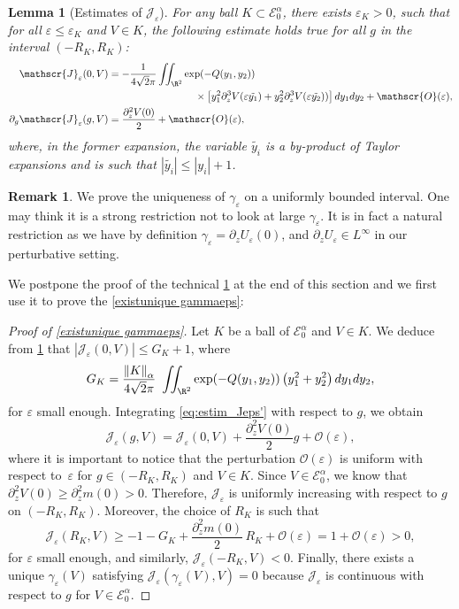\documentclass[10pt]{amsart}
\let\mathcal\mathscr
\newcommand{\cO}{\mathcal{O}}
\theoremstyle{plain}
\newtheorem{lem}[thm]{Lemma}
\theoremstyle{definition}
\newtheorem{remark}[thm]{Remark}
\newcommand{\Je}{\mathcal{J}_\eps}
\let\eps\varepsilon
\newcommand{\abs}[1]{\left\lvert#1\right\rvert}
\newcommand{\nalph}[1]{\left\lVert#1\right\rVert_\alpha}
\newcommand{\Eaz}{\mathcal{E}^\alpha_0}
\newcommand{\RK}{R_K}
\newcommand{\GK}{G_K}
\begin{document}
\begin{lem}[Estimates of $\Je$]\label{estimate Jeps}
For any ball $K \subset \Eaz$, there exists $\eps_K>0$, such that for all $\eps \leq \eps_K$ and $V \in K$, the following estimate holds true for all $g$ in the interval $(-\RK, \RK)$:
\begin{align}
\label{eq:estim_Jeps}
\Je(0,V) & = - \dfrac{1}{4 \sqrt{2}\pi} \iint _{\R^2} \exp(-Q (y_1,y_2))\\
&\hspace*{3cm}\times \left[ y_1^2 \partial_z^3 V(\eps \tilde{y_1}) + y_2^2 \partial_z^3 V(\eps \tilde{y_2})) \right] dy_1dy_2 + \cO(\eps),\notag \\
\label{eq:estim_Jeps'} \partial_g \Je(g,V)& =\dfrac{\partial^2_z V(0)}{2} + \cO(\eps),
\end{align}
where, in the former expansion, the variable $\tilde{y_i}$ is a by-product of Taylor expansions and is such that $\abs{\tilde{y_i}} \leq \abs{ y_i}+1$.
\end{lem}

\begin{remark}
We prove the uniqueness of $\gamma_\eps$ on a uniformly bounded interval. One may think it is a strong restriction not to look at large $\gamma_\eps$. It is in fact a natural restriction as we have by definition $\gamma_\eps = \partial_zU_\eps(0)$, and $\partial_z U_\eps \in L^\infty$ in our perturbative setting.
\end{remark}
We postpone the proof of the technical \cref{estimate Jeps} at the end of this section and we first use it to prove the \cref{existunique gammaeps}: \begin{proof}[Proof of \cref{existunique gammaeps}]
Let $K$ be a ball of $\Eaz$ and $V \in K$. We deduce from \cref{estimate Jeps} that $|\Je(0,V)| \leq \GK + 1$, where
\begin{equation*}
\GK = \dfrac{\nalph{K}}{4 \sqrt{2}\pi } \ \iint _{\R^2} \exp(-Q (y_1,y_2)) \left (y_1^2 + y_2^2 \right) dy_1dy_2,
\end{equation*}
for $\eps$ small enough. Integrating \eqref{eq:estim_Jeps'} with respect to $g$, we obtain
\begin{equation*}
\Je(g,V) = \Je(0,V) + \dfrac{\partial^2_z V(0)}{2} g + \cO(\eps),
\end{equation*}
where it is important to notice that the perturbation $\cO(\eps)$ is uniform with respect to~$\eps$ for $g\in (-\RK,\RK)$ and $V\in K$.
Since $V\in \Eaz$, we know that $\partial_z^2V(0)\geq \partial_z^2m(0)>0$. Therefore, $\Je$ is uniformly increasing with respect to $g$ on $(-\RK,\RK)$. Moreover, the choice of $\RK$ is such that
\begin{equation*}
\Je(\RK,V) \geq - 1 - \GK + \dfrac{\partial^2_z m(0)}{2}\, \RK + \cO(\eps) = 1 + \cO(\eps) >0,
\end{equation*}
for $\eps$ small enough, and similarly, $\Je(-\RK,V) < 0$. Finally, there exists a unique $\gamma_\eps(V)$ satisfying $\Je(\gamma_\eps(V),V)= 0$ because $\Je$ is continuous with respect to $g$ for $V\in \Eaz$.
\end{proof}
\end{document}
